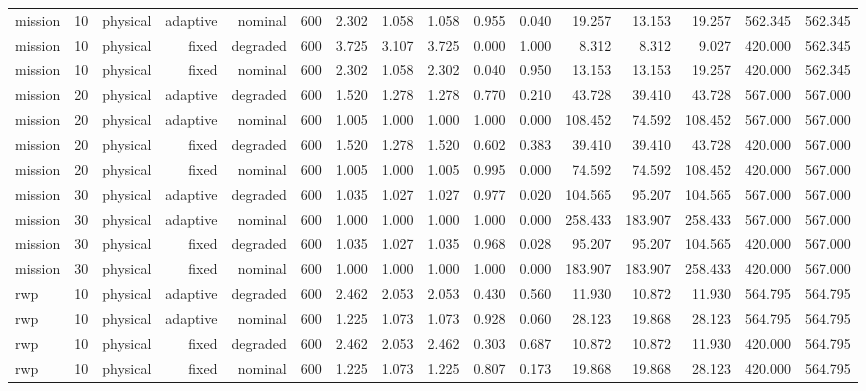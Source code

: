 \begin{tabular}{lrrrrrrrrrrrrrrr}
mission & 10 & physical & adaptive & nominal & 600 & 2.302 & 1.058 & 1.058 & 0.955 & 0.040 & 19.257 & 13.153 & 19.257 & 562.345 & 562.345 \\
mission & 10 & physical & fixed & degraded & 600 & 3.725 & 3.107 & 3.725 & 0.000 & 1.000 & 8.312 & 8.312 & 9.027 & 420.000 & 562.345 \\
mission & 10 & physical & fixed & nominal & 600 & 2.302 & 1.058 & 2.302 & 0.040 & 0.950 & 13.153 & 13.153 & 19.257 & 420.000 & 562.345 \\
mission & 20 & physical & adaptive & degraded & 600 & 1.520 & 1.278 & 1.278 & 0.770 & 0.210 & 43.728 & 39.410 & 43.728 & 567.000 & 567.000 \\
mission & 20 & physical & adaptive & nominal & 600 & 1.005 & 1.000 & 1.000 & 1.000 & 0.000 & 108.452 & 74.592 & 108.452 & 567.000 & 567.000 \\
mission & 20 & physical & fixed & degraded & 600 & 1.520 & 1.278 & 1.520 & 0.602 & 0.383 & 39.410 & 39.410 & 43.728 & 420.000 & 567.000 \\
mission & 20 & physical & fixed & nominal & 600 & 1.005 & 1.000 & 1.005 & 0.995 & 0.000 & 74.592 & 74.592 & 108.452 & 420.000 & 567.000 \\
mission & 30 & physical & adaptive & degraded & 600 & 1.035 & 1.027 & 1.027 & 0.977 & 0.020 & 104.565 & 95.207 & 104.565 & 567.000 & 567.000 \\
mission & 30 & physical & adaptive & nominal & 600 & 1.000 & 1.000 & 1.000 & 1.000 & 0.000 & 258.433 & 183.907 & 258.433 & 567.000 & 567.000 \\
mission & 30 & physical & fixed & degraded & 600 & 1.035 & 1.027 & 1.035 & 0.968 & 0.028 & 95.207 & 95.207 & 104.565 & 420.000 & 567.000 \\
mission & 30 & physical & fixed & nominal & 600 & 1.000 & 1.000 & 1.000 & 1.000 & 0.000 & 183.907 & 183.907 & 258.433 & 420.000 & 567.000 \\
rwp & 10 & physical & adaptive & degraded & 600 & 2.462 & 2.053 & 2.053 & 0.430 & 0.560 & 11.930 & 10.872 & 11.930 & 564.795 & 564.795 \\
rwp & 10 & physical & adaptive & nominal & 600 & 1.225 & 1.073 & 1.073 & 0.928 & 0.060 & 28.123 & 19.868 & 28.123 & 564.795 & 564.795 \\
rwp & 10 & physical & fixed & degraded & 600 & 2.462 & 2.053 & 2.462 & 0.303 & 0.687 & 10.872 & 10.872 & 11.930 & 420.000 & 564.795 \\
rwp & 10 & physical & fixed & nominal & 600 & 1.225 & 1.073 & 1.225 & 0.807 & 0.173 & 19.868 & 19.868 & 28.123 & 420.000 & 564.795 \\

\end{tabular}
